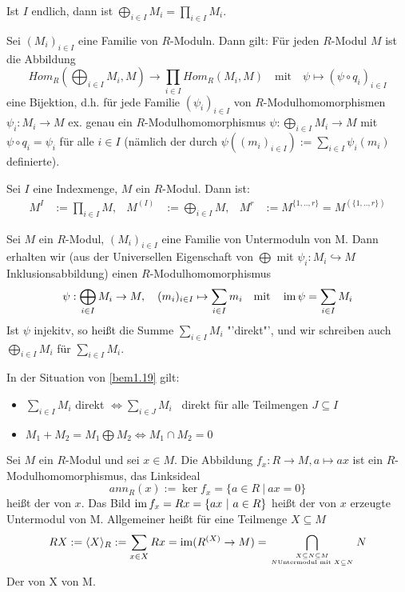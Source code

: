 \begin{anm}
	Ist $I$ endlich, dann ist $\bigoplus_{i \in I}M_i = \prod_{i \in I} M_i$.
\end{anm}
\begin{sa}\label{sa1.18} Sei $(M_i)_{i \in I}$ eine Familie von $R$-Moduln. Dann gilt: Für jeden $R$-Modul $M$ ist die Abbildung $$ Hom_{R}(\bigoplus_{i \in I} M_i,M) \to \prod_{i \in I} Hom_{R}(M_i,M) \quad \text{mit} \quad \psi \mapsto (\psi \circ q_i)_{i \in I}$$
	eine Bijektion, d.h. für jede Familie $(\psi_i)_{i \in I}$ von $R$-Modulhomomorphismen $\psi_i: M_i \to M $ ex. genau ein $R$-Modulhomomorphismus $\psi: \bigoplus_{i \in I}M_i \to M$ mit $ \psi \circ q_i = \psi_i$ für alle $i \in I$ (nämlich der durch $\psi((m_i)_{i \in I}) := \sum_{i\in I} \psi_i(m_i)$ definierte).
\end{sa}
\begin{anm}
	Sei $I$ eine Indexmenge, $M$ ein $R$-Modul. Dann ist:\\
	 \begin{align*}
	 M^I &:= \prod_{i \in I}M, & M^{(I)} &:= \bigoplus_{i \in I}M, & M^{r} &:= M^{\{1,..,r\}}=M^{(\{1,..,r\})}
	 \end{align*}
\end{anm}
\begin{bem}\label{bem1.19}
	Sei $M$ ein $R$-Modul, $(M_i)_{i \in I}$ eine Familie von Untermoduln von M. Dann erhalten wir (aus der Universellen Eigenschaft von $\bigoplus$ mit $\psi_i:M_i\hookrightarrow M$ Inklusionsabbildung) einen $R$-Modulhomomorphismus $$ \psi:\bigoplus_{i \in I} M_i \to M, \quad (m_i)_{i \in I} \mapsto \sum_{i\in I}m_i \quad \text{mit} \quad\operatorname{im}\psi = \sum_{i\in I}M_i $$
	Ist $\psi$ injekitv, so heißt die Summe $\sum_{i\in I}M_i $ "'direkt"', und wir schreiben auch $\bigoplus_{i \in I}M_i $ für $ \sum_{i\in I}M_i$.
\end{bem}
\begin{anm} In der Situation von \ref{bem1.19} gilt:
	\begin{itemize}
		\item $\sum_{i\in I}M_i $ direkt $\Longleftrightarrow \sum_{i\in J}M_i $ \ direkt für alle Teilmengen $J \subseteq I$ 
		\item $M_1+M_2 = M_1 \bigoplus M_2 \Longleftrightarrow M_1 \cap M_2 =0$
	\end{itemize}
\end{anm}
\begin{df}\label{df1.20}
	Sei $M$ ein $R$-Modul und sei $x \in M$. Die Abbildung $f_{x}:R \to M, a \mapsto ax$ ist ein $R$-Modulhomomorphismus, das Linksideal $$ ann_{R}(x) := \ker f_x = \{a \in R \ | \  ax=0\}$$ heißt der  von $x$. Das Bild $\operatorname{im} f_x = Rx=\{ax \ | \ a \in R\} $ heißt der von $x$ erzeugte Untermodul von M. Allgemeiner heißt für eine Teilmenge $X \subseteq M$ $$ RX := \langle X\rangle_{R} := \sum_{x\in X} Rx = \operatorname{im}(R^{(X)} \to M) = \bigcap_{X \subseteq N \subseteq M \atop N \text{Untermodul} \text{ mit } X \subseteq N}N $$
	Der von X  von M.
\end{df}
